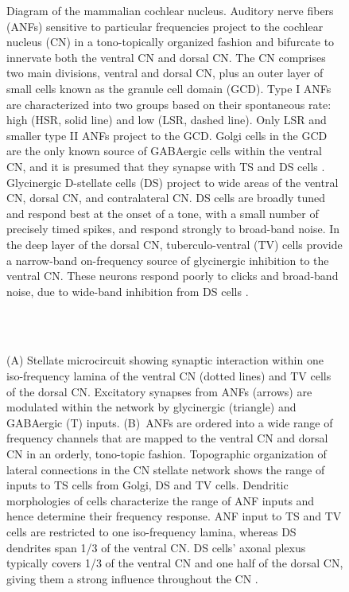  \begin{figure}[pt!]
\centering
   \caption{Diagram of the mammalian cochlear nucleus. Auditory nerve
    fibers (ANFs) sensitive to particular frequencies project to the
    cochlear nucleus (CN) in a tono-topically organized fashion and
    bifurcate to innervate both the ventral CN and dorsal CN\@. The
    CN comprises two main divisions, ventral and dorsal CN, plus an
    outer layer of small cells known as the granule cell domain
    (GCD). Type I ANFs are characterized into two groups based on
    their spontaneous rate: high (HSR, solid line) and low (LSR,
    dashed line). Only LSR and smaller type II ANFs project to the
    GCD\@.  Golgi cells in the GCD are the only known source of
    GABAergic cells within the ventral CN, and it is presumed that
    they synapse with TS and DS cells
    \cite{FerragamoGoldingEtAl:1998}. Glycinergic D-stellate cells
    (DS) project to wide areas of the ventral CN, dorsal CN, and
    contralateral CN\@. DS cells are broadly tuned and respond best
    at the onset of a tone, with a small number of precisely timed
    spikes, and respond strongly to broad-band noise.  In the deep
    layer of the dorsal CN, tuberculo-ventral (TV) cells provide a
    narrow-band on-frequency source of glycinergic inhibition to the
    ventral CN\@. These neurons respond poorly to clicks and
    broad-band noise, due to wide-band inhibition from DS cells
    \cite{SpirouDavisEtAl:1999}.}
\label{fig:GA:CNdiagram}

 \end{figure}
 \clearpage


\begin{figure}[t!]
\centering
{}\hfill\\
\hfill\\
\caption{(A) Stellate microcircuit showing synaptic interaction within one
  iso-frequency lamina of the ventral CN (dotted lines) and TV cells of the
  dorsal CN\@. Excitatory synapses from ANFs (arrows) are modulated within the
  network by glycinergic (triangle) and GABAergic (T) inputs. (B)~ANFs are
  ordered into a wide range of frequency channels that are mapped to the ventral
  CN and dorsal CN in an orderly, tono-topic fashion. Topographic organization
  of lateral connections in the CN stellate network shows the range of inputs to
  TS cells from Golgi, DS and TV cells. Dendritic morphologies of cells
  characterize the range of ANF inputs and hence determine their frequency
  response. ANF input to TS and TV cells are restricted to one iso-frequency
  lamina, whereas DS dendrites span 1/3 of the ventral CN\@. DS cells' axonal
  plexus typically covers 1/3 of the ventral CN and one half of the dorsal CN,
  giving them a strong influence throughout the CN
  \cite{ArnottWallaceEtAl:2004}.}
\label{fig:GA:MicroCN}
\end{figure}

